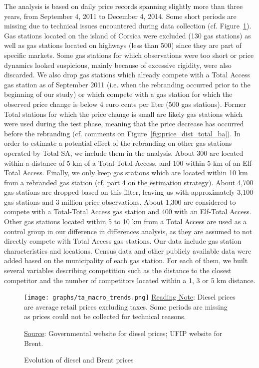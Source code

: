 \documentclass[english]{article}
\begin{document}
The analysis is based on daily price records spanning slightly more than three years, from September 4, 2011 to December 4, 2014. Some short periods are missing due to technical issues encountered during data collection (cf. Figure~\ref{fig:diesel_and_brent}). Gas stations located on the island of Corsica were excluded (130 gas stations) as well as gas stations located on highways (less than 500) since they are part of specific markets. Some gas stations for which observations were too short or price dynamics looked suspicious, mainly because of excessive rigidity, were also discarded. We also drop gas stations which already compete with a Total Access gas station as of September 2011 (i.e. when the rebranding occurred prior to the beginning of our study) or which compete with a gas station for which the observed price change is below 4 euro cents per liter (500 gas stations). Former Total stations for which the price change is small are likely gas stations which were used during the test phase, meaning that the price decrease has occurred before the rebranding (cf. comments on Figure~\ref{fig:price_dist_total_ba}). In order to estimate a potential effect of the rebranding on other gas stations operated by Total SA, we include them in the analysis. About 300 are located within a distance of 5 km of a Total-Total Access, and 100 within 5 km of an Elf-Total Access. Finally, we only keep gas stations which are located within 10 km from a rebranded gas station (cf. part 4 on the estimation strategy). About 4,700 gas stations are dropped based on this filter, leaving us with approximately 3,100 gas stations and 3 million price observations. About 1,300 are considered to compete with a Total-Total Access gas station and 400 with an Elf-Total Access. Other gas stations located within 5 to 10 km from a Total Access are used as a control group in our difference in differences analysis, as they are assumed to not directly compete with Total Access gas stations. Our data include gas station characteristics and locations. Census data and other publicly available data were added based on the municipality of each gas station. For each of them, we built several variables describing competition such as the distance to the closest competitor and the number of competitors located within a 1, 3 or 5 km distance.
\medskip{}

\begin{figure}[htb!]
    \caption{Evolution of diesel and Brent prices}
		\label{fig:diesel_and_brent}
\texttt{[image: graphs/ta\_macro\_trends.png]}
\flushleft
{\small{}\uline{Reading Note}}{\small{}:
Diesel prices are average retail prices excluding taxes. Some periods are missing as prices could not be collected for technical reasons.}{\small \par}
{\small{}\uline{Source}}{\small{}: Governmental website for diesel prices; UFIP website for Brent.}\medskip{}
\end{figure}
\end{document}
